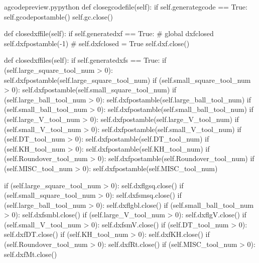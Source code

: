 \documentclass{ltxdoc}
\begin{document}
\lstset{firstnumber=\thegcpy}
\begin{writecode}{a}{gcodepreview.py}{python}
    def closegcodefile(self):
        if self.generategcode == True:
            self.gcodepostamble()
            self.gc.close()

    def closedxffile(self):
        if self.generatedxf == True:
#            global dxfclosed
            self.dxfpostamble(-1)
#            self.dxfclosed = True
            self.dxf.close()
    
    def closedxffiles(self):
        if self.generatedxfs == True:
            if (self.large_square_tool_num > 0):
                self.dxfpostamble(self.large_square_tool_num)
            if (self.small_square_tool_num > 0):
                self.dxfpostamble(self.small_square_tool_num)
            if (self.large_ball_tool_num > 0):
                self.dxfpostamble(self.large_ball_tool_num)
            if (self.small_ball_tool_num > 0):
                self.dxfpostamble(self.small_ball_tool_num)
            if (self.large_V_tool_num > 0):
                self.dxfpostamble(self.large_V_tool_num)
            if (self.small_V_tool_num > 0):
                self.dxfpostamble(self.small_V_tool_num)
            if (self.DT_tool_num > 0):
                self.dxfpostamble(self.DT_tool_num)
            if (self.KH_tool_num > 0):
                self.dxfpostamble(self.KH_tool_num)
            if (self.Roundover_tool_num > 0):
                self.dxfpostamble(self.Roundover_tool_num)
            if (self.MISC_tool_num > 0):
                self.dxfpostamble(self.MISC_tool_num)
                
            if (self.large_square_tool_num > 0):
                self.dxflgsq.close()
            if (self.small_square_tool_num > 0):
                self.dxfsmsq.close()
            if (self.large_ball_tool_num > 0):
                self.dxflgbl.close()
            if (self.small_ball_tool_num > 0):
                self.dxfsmbl.close()
            if (self.large_V_tool_num > 0):
                self.dxflgV.close()
            if (self.small_V_tool_num > 0):
                self.dxfsmV.close()
            if (self.DT_tool_num > 0):
                self.dxfDT.close()
            if (self.KH_tool_num > 0):
                self.dxfKH.close()
            if (self.Roundover_tool_num > 0):
                self.dxfRt.close()
            if (self.MISC_tool_num > 0):
                self.dxfMt.close()

\end{writecode}
\addtocounter{gcpy}{55}
%
\end{document}
